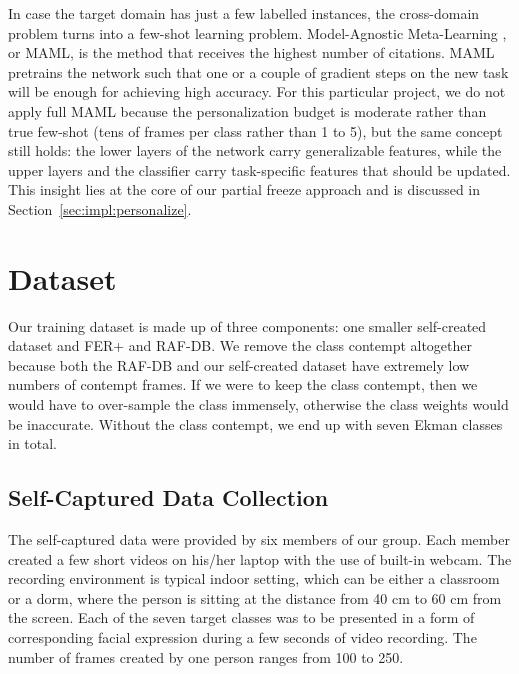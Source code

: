 \documentclass[12pt,a4paper]{article}
\begin{document}
In case the target domain has just a few labelled instances,
the cross-domain problem turns into a few-shot learning problem.
Model-Agnostic Meta-Learning \autocite{finn2017maml},
or MAML, is the method that receives the highest number of citations.
MAML pretrains the network such that one or a couple of gradient
steps on the new task will be enough for achieving high accuracy.
For this particular project, we do not apply full MAML because the
personalization budget is moderate rather than true few-shot
(tens of frames per class rather than 1 to 5), but the same concept
still holds: the lower layers of the network carry generalizable
features, while the upper layers and the classifier carry task-specific
features that should be updated. This insight lies at the core of
our partial freeze approach and is discussed in Section~\ref{sec:impl:personalize}.

\section{Dataset}
\label{sec:data}

Our training dataset is made up of three components: one smaller self-created dataset and
FER+ and RAF-DB. We remove the class contempt altogether because both the RAF-DB and our
self-created dataset have extremely low numbers of contempt frames. If we were to keep the
class contempt, then we would have to over-sample the class immensely, otherwise the class
weights would be inaccurate. Without the class contempt, we end up with seven Ekman
classes in total.

\subsection{Self-Captured Data Collection}
\label{sec:data:self}

The self-captured data were provided by six members of our group. Each member
created a few short videos on his/her laptop with the use of built-in webcam. The
recording environment is typical indoor setting, which can be either a classroom or a dorm,
where the person is sitting at the distance from 40 cm to 60 cm from the screen. Each of the
seven target classes was to be presented in a form of corresponding facial expression
during a few seconds of video recording. The number of frames created by one person
ranges from 100 to 250.
\end{document}

